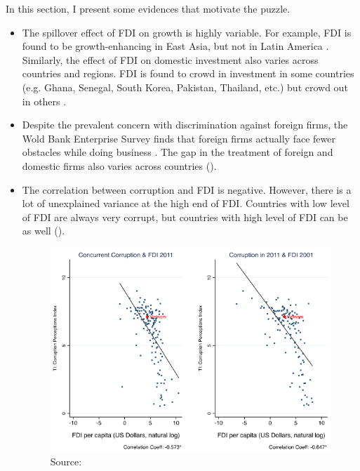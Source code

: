 In this section, I present some evidences that motivate the puzzle.

\begin{itemize}
	\item The spillover effect of FDI on growth is highly variable. For example, FDI is found to be growth-enhancing in East Asia, but not in Latin America \citep{Zhang2001}. Similarly, the effect of FDI on domestic investment also varies across countries and regions. FDI is found to crowd in investment in some countries (e.g. Ghana, Senegal, South Korea, Pakistan, Thailand, etc.) but crowd out in others \citep{Agosin2005}.
	
	\item Despite the prevalent concern with discrimination against foreign firms, the Wold Bank Enterprise Survey finds that foreign firms actually face fewer obstacles while doing business \citep{Batra2003}. The gap in the treatment of foreign and domestic firms also varies across countries ().
	
	\item The correlation between corruption and FDI is negative. However, there is a lot of unexplained variance at the high end of FDI. Countries with low level of FDI are always very corrupt, but countries with high level of FDI can be as well ().
	
	\begin{figure}[!ht]
	\includegraphics[width=\textwidth, height=\textheight,keepaspectratio]{../figure/fdi_corruption}
	\caption{Source: \citep{Malesky2015}}
	\label{fig:fdi_corruption}
	\end{figure}
\end{itemize}

